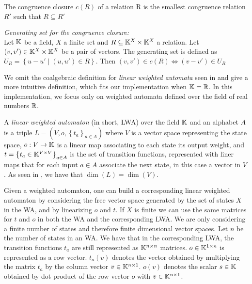 \begin{defn}
  The congruence closure $c(R)$ of a relation R is the smallest congruence relation 
  $R'$ such that $R \subseteq R'$ 
\end{defn}

\begin{defn}
  \label{def:congclos}
  \textit{Generating set for the congruence closure:} \\
  Let $\mathbb{K}$ be a field, $X$ a finite set and $R \subseteq \mathbb{K}^X \times \mathbb{K}^X$
  a relation. Let $(v, v') \in \mathbb{K}^X \times \mathbb{K}^X$ be a pair of vectors.
  The generating set is defined as  $U_R = \left\lbrace u - u' \mid (u, u') \in R \right\rbrace$.
  Then $(v, v') \in c(R) \iff (v - v') \in U_R$
\end{defn}




We omit the coalgebraic definition for \textit{linear weighted automata} seen in 
\cite{BONCHI201277} and give a more intuitive definition, which fits our  
implementation when $\mathbb{K} = \mathbb{R}$.
In this implementation, we focus only on weighted automata defined over 
the field of real numbers $\mathbb{R}$. 

\begin{defn}
  A \textit{linear weighted automaton} (in short, LWA) over the field $\mathbb{K}$ and 
  an alphabet $A$
  is a triple  $L = (V, o, \left\lbrace t_a \right\rbrace_{a \in A})$ 
  where $V$ is a vector space representing the state space, 
  $o: V \to \mathbb{K}$ is a linear map associating to each state its output weight,
  and $t = \left\lbrace t_a \in \mathbb{K}^{V \times V} \right\rbrace_{a \in A}$ is
  the set of transition functions, represented with liner maps 
  that for each input $a \in A$ associate the next state, in this case a vector
  in $V$.
  As seen in \cite{boreale2009weighted}, we have that $\dim{(L)} = \dim{(V)}$.
\end{defn}

Given a weighted automaton, one can build a corresponding linear weighted automaton
by considering the free vector space generated by the set of states $X$ in the WA,
and by linearizing $o$ and $t$. If $X$ is finite we can use the same matrices for 
$t$ and $o$ in both the WA and the corresponding LWA.
We are only considering a finite number of states and therefore finite dimensional
vector spaces. Let $n$ be the number of states in an WA.
We have that in the corresponding LWA, the transition functions $t_a$ are still
 represented as
$\mathbb{K}^{n \times n}$ matrices. $o \in \mathbb{K}^{1 \times n}$ is represented as a row vector.
$t_a(v)$ denotes the vector obtained by multiplying the matrix $t_a$ by the column 
vector $v  \in \mathbb{K}^{n \times 1}$. $o(v)$ denotes the scalar $s \in \mathbb{K}$ obtained by 
dot product of the row vector $o$ with $v \in \mathbb{K}^{n \times 1}$.

